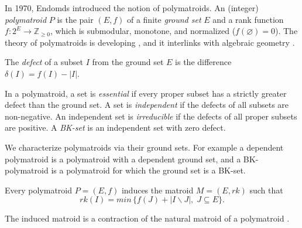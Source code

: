 \documentclass[11pt]{article}
\theoremstyle{plain}
\theoremstyle{definition}
\theoremstyle{remark}
\theoremstyle{plain}
\theoremstyle{plain}
\theoremstyle{plain}
\theoremstyle{definition}
\begin{document}
In 1970, Endomds introduced the notion of polymatroids. An (integer)
\textit{polymatroid} $P$ is the pair $(E,f)$ of a finite \textit{ground
set} $E$ and a rank function $f:2^{E}\rightarrow\mathbb{Z}_{\geq0}$,
which is submodular, monotone, and normalized ($f(\varnothing)=0$).
The theory of polymatroids is developing \cite{csirmaz_cyclic_2020,crowley_bergman_2022,bonin_natural_2023,swartz_polymatroids_2024},
and it interlinks with algebraic geometry \cite{pagaria_hodge_2023,eur_intersection_2024,baker_representation_2025}.

The \textit{defect} of a subset $I$ from the ground set $E$ is the
difference $\delta(I)=f(I)-|I|$.

In a polymatroid, a set is \textit{essential} if every proper subset
has a strictly greater defect than the ground set. A set is\textit{
independent} if the defects of all subsets are non-negative. An independent
set is \textit{irreducible} if the defects of all proper subsets are
positive. A \textit{BK-set} is an independent set with zero defect.

We characterize polymatroids via their ground sets. For example a
dependent polymatroid is a polymatroid with a dependent ground set,
and a BK-polymatroid is a polymatroid for which the ground set is
a BK-set.

Every polymatroid $P=(E,f)$ induces the matroid $M=(E,rk)$ \cite{mcdiarmid_independence_1973,welsh_matroid_1986}
such that 
\[
rk(I)=min\,\{f(J)+|I\backslash J|,\;J\subseteq E\}.
\]

The induced matroid is a contraction of the natural matroid of a polymatroid
\cite{bonin_natural_2023}. 
\end{document}
